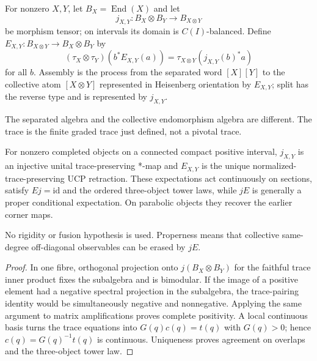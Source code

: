 \begin{definition}
For nonzero $X,Y$, let $B_X=\operatorname{End}(X)$ and let
\[
 j_{X,Y}:B_X\otimes B_Y\longrightarrow B_{X\otimes Y}
\]
be morphism tensor; on intervals its domain is $C(I)$-balanced.  Define
$E_{X,Y}:B_{X\otimes Y}\to B_X\otimes B_Y$ by
\[
 (\tau_X\otimes\tau_Y)(b^*E_{X,Y}(a))
   =\tau_{X\otimes Y}(j_{X,Y}(b)^*a)
\]
for all $b$.  Assembly is the process from the separated word $[X][Y]$ to
the collective atom $[X\otimes Y]$ represented in Heisenberg orientation by
$E_{X,Y}$; split has the reverse type and is represented by $j_{X,Y}$.
\end{definition}
\begin{scope}
The separated algebra and the collective endomorphism algebra are different.
The trace is the finite graded trace just defined, not a pivotal trace.
\end{scope}

\begin{theorem}
{\normalfont\statusProved}\quad
For nonzero completed objects on a connected compact positive interval,
$j_{X,Y}$ is an injective unital trace-preserving *-map and $E_{X,Y}$ is the
unique normalized-trace-preserving UCP retraction.  These expectations act
continuously on sections, satisfy $Ej=\mathrm{id}$ and the ordered
three-object tower laws, while $jE$ is generally a proper conditional
expectation.  On parabolic objects they recover the earlier corner maps.
\end{theorem}
\begin{scope}
No rigidity or fusion hypothesis is used.  Properness means that collective
same-degree off-diagonal observables can be erased by $jE$.
\end{scope}
\begin{proof}
In one fibre, orthogonal projection onto $j(B_X\otimes B_Y)$ for the faithful
trace inner product fixes the subalgebra and is bimodular.  If the image of a
positive element had a negative spectral projection in the subalgebra, the
trace-pairing identity would be simultaneously negative and nonnegative.
Applying the same argument to matrix amplifications proves complete
positivity.  A local continuous basis turns the trace equations into
$G(q)c(q)=t(q)$ with $G(q)>0$; hence $c(q)=G(q)^{-1}t(q)$ is continuous.
Uniqueness proves agreement on overlaps and the three-object tower law.
\end{proof}
